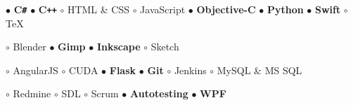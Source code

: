 \documentclass[11pt,a4paper]{article}
\begin{document}
    \bigskip



    \smallskip


    \smallskip
    $\bullet$ {\bf C\texttt{\#}}
    \hspace{0.34cm}
    $\bullet$ {\bf C\texttt{++}}
    \hspace{0.34cm}
    $\circ$ HTML \& CSS
    \hspace{0.34cm}
    $\circ$ JavaScript
    \hspace{0.34cm}
    $\bullet$ {\bf Objective-C}
    \hspace{0.34cm}
    $\bullet$ {\bf Python}
    \hspace{0.34cm}
    $\bullet$ {\bf Swift}
    \hspace{0.34cm}
    $\circ$ TeX


    \smallskip


    \smallskip
    $\circ$ Blender
    \hspace{0.34cm}
    $\bullet$ {\bf Gimp}
    \hspace{0.34cm}
    $\bullet$ {\bf Inkscape}
    \hspace{0.34cm}
    $\circ$ Sketch


    \smallskip


    \smallskip
    $\circ$ AngularJS
    \hspace{0.34cm}
    $\circ$ CUDA
    \hspace{0.34cm}
    $\bullet$ {\bf Flask}
    \hspace{0.34cm}
    $\bullet$ {\bf Git}
    \hspace{0.34cm}
    $\circ$ Jenkins
    \hspace{0.34cm}
    $\circ$ MySQL \& MS SQL

    \vspace{0.04cm}
    $\circ$ Redmine
    \hspace{0.34cm}
    $\circ$ SDL
    \hspace{0.34cm}
    $\circ$ Scrum
    \hspace{0.34cm}
    $\bullet$ {\bf Autotesting}
    \hspace{0.34cm}
    $\bullet$ {\bf WPF}
\end{document}
